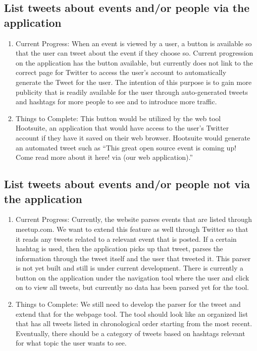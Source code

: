 \documentclass[letterpaper,10pt,onecolumn]{IEEEtran} %
\begin{document}
\subsection{List tweets about events and/or people via the application}
\begin{enumerate}[label*=\arabic*.]
  \item Current Progress: When an event is viewed by a user, a button is available
    so that the user can tweet about the event if they choose so. Current
    progression on the application has the button available, but currently does
    not link to the correct page for Twitter to access the user’s account to
    automatically generate the Tweet for the user. The intention of this purpose
    is to gain more publicity that is readily available for the user through
    auto-generated tweets and hashtags for more people to see and to introduce
    more traffic.

  \item Things to Complete: This button would be utilized by the web tool
    Hootsuite, an application that would have access to the user’s Twitter account
    if they have it saved on their web browser. Hootsuite would generate an
    automated tweet such as “This great open source event is coming up! Come read
    more about it here! via (our web application).”
\end{enumerate}

\subsection{List tweets about events and/or people not via the application}
\begin{enumerate}[label*=\arabic*.]
  \item Current Progress: Currently, the website parses events that are listed
    through meetup.com. We want to extend this feature as well through Twitter so
    that it reads any tweets related to a relevant event that is posted. If a
    certain hashtag is used, then the application picks up that tweet, parses the
    information through the tweet itself and the user that tweeted it. This parser
    is not yet built and still is under current development. There is currently a
    button on the application under the navigation tool where the user and click
    on to view all tweets, but currently no data has been parsed yet for the tool.

  \item Things to Complete: We still need to develop the parser for the tweet and
    extend that for the webpage tool. The tool should look like an organized list
    that has all tweets listed in chronological order starting from the most
    recent. Eventually, there should be a category of tweets based on hashtags
    relevant for what topic the user wants to see.
\end{enumerate}
\end{document}
